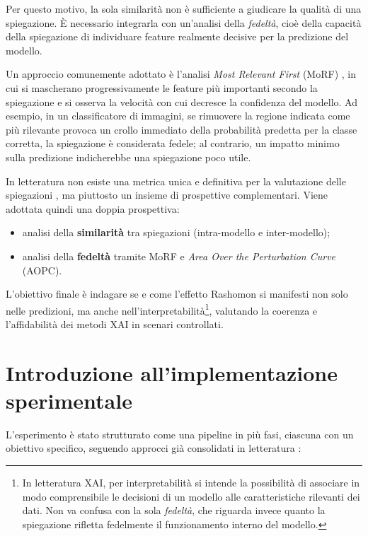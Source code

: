 \documentclass[12pt,a4paper,oneside]{report}
\numberwithin{figure}{chapter}
\numberwithin{table}{chapter}
\begin{document}
Per questo motivo, la sola similarità non è sufficiente a giudicare la qualità
di una spiegazione. È necessario integrarla con un’analisi della
\emph{fedeltà}, cioè della capacità della spiegazione di individuare feature
realmente decisive per la predizione del modello.

Un approccio comunemente adottato è l’analisi \emph{Most Relevant First} (MoRF)
\cite{samek2016evaluating}, in cui si mascherano progressivamente le feature
più importanti secondo la spiegazione e si osserva la velocità con cui decresce
la confidenza del modello. Ad esempio, in un classificatore di immagini, se
rimuovere la regione indicata come più rilevante provoca un crollo immediato
della probabilità predetta per la classe corretta, la spiegazione è considerata
fedele; al contrario, un impatto minimo sulla predizione indicherebbe una
spiegazione poco utile.

In letteratura non esiste una metrica unica e definitiva per la valutazione
delle spiegazioni \cite{adadi2018survey}, ma piuttosto un insieme di
prospettive complementari. Viene adottata quindi una doppia prospettiva:
\begin{itemize}
      \item analisi della \textbf{similarità} tra spiegazioni (intra-modello e
            inter-modello);
      \item analisi della \textbf{fedeltà} tramite MoRF e \emph{Area Over the Perturbation
                  Curve} (AOPC).
\end{itemize}

L’obiettivo finale è indagare se e come l’effetto Rashomon si manifesti non
solo nelle predizioni, ma anche nell’interpretabilità\footnote{In letteratura
      XAI, per interpretabilità si intende la possibilità di associare in modo
      comprensibile le decisioni di un modello alle caratteristiche rilevanti dei
      dati. Non va confusa con la sola \emph{fedeltà}, che riguarda invece quanto la
      spiegazione rifletta fedelmente il funzionamento interno del modello.},
valutando la coerenza e l’affidabilità dei metodi XAI in scenari controllati.

\chapter{Introduzione all’implementazione sperimentale}

L’esperimento è stato strutturato come una pipeline in più fasi, ciascuna con
un obiettivo specifico, seguendo approcci già consolidati in letteratura
\citep{mueller2023rashomon,leventi2023consistency,adadi2018survey}:
\end{document}
